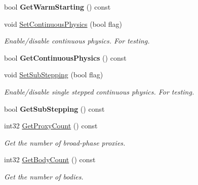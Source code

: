 \begin{DoxyCompactItemize}
\mbox{\label{classb2World_af23e93dbf44ebfc3c7ce9dfdc00b8ff7}} 
bool {\bfseries Get\+Warm\+Starting} () const
\item 
\mbox{\label{classb2World_a536dd9181c2e20096073e3cfe2c8530a}} 
void \hyperlink{classb2World_a536dd9181c2e20096073e3cfe2c8530a}{Set\+Continuous\+Physics} (bool flag)
\begin{DoxyCompactList}\small\item\em Enable/disable continuous physics. For testing. \end{DoxyCompactList}\item 
\mbox{\label{classb2World_afec853cfec7a8bbffc20d4acc99963e7}} 
bool {\bfseries Get\+Continuous\+Physics} () const
\item 
\mbox{\label{classb2World_ae8aacc78ea4753075067daff51b61778}} 
void \hyperlink{classb2World_ae8aacc78ea4753075067daff51b61778}{Set\+Sub\+Stepping} (bool flag)
\begin{DoxyCompactList}\small\item\em Enable/disable single stepped continuous physics. For testing. \end{DoxyCompactList}\item 
\mbox{\label{classb2World_aa41f23e3e12f82ce229ce644ecdac28b}} 
bool {\bfseries Get\+Sub\+Stepping} () const
\item 
\mbox{\label{classb2World_a088742d580bfc42531790ea8747bb8f8}} 
int32 \hyperlink{classb2World_a088742d580bfc42531790ea8747bb8f8}{Get\+Proxy\+Count} () const
\begin{DoxyCompactList}\small\item\em Get the number of broad-\/phase proxies. \end{DoxyCompactList}\item 
\mbox{\label{classb2World_a41c8b37baf5165c06932e8f08eb758de}} 
int32 \hyperlink{classb2World_a41c8b37baf5165c06932e8f08eb758de}{Get\+Body\+Count} () const
\begin{DoxyCompactList}\small\item\em Get the number of bodies. \end{DoxyCompactList}\item 

\end{DoxyCompactItemize}
